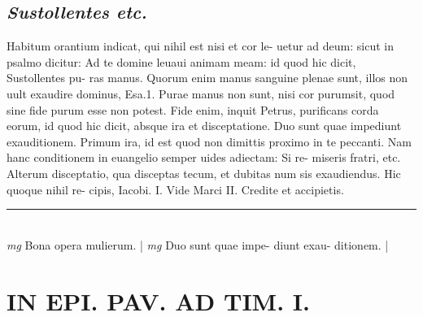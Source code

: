 \documentclass{article}
\begin{document}
\begin{pages}
\subsection*{\textit{Sustollentes etc. }}\pstart Habitum orantium indicat, qui nihil est nisi et cor le- uetur ad deum: sicut in psalmo dicitur: Ad te domine leuaui animam meam: id quod hic dicit, Sustollentes pu- ras manus. Quorum enim manus sanguine plenae sunt, illos non uult exaudire dominus, Esa.1. Purae manus non sunt, nisi cor purumsit, quod sine fide purum esse non potest. Fide enim, inquit Petrus, purificans corda eorum, id quod hic dicit, absque  ira et disceptatione. Duo sunt quae impediunt exauditionem. Primum ira, id est quod non dimittis proximo in te peccanti. Nam hanc conditionem in euangelio semper uides adiectam: Si re- miseris fratri, etc. Alterum disceptatio, qua disceptas tecum, et dubitas num sis exaudiendus. Hic quoque  nihil re- cipis, Iacobi. I. Vide Marci II. Credite et accipietis.  \pend
\vspace{0.5cm}\noindent
\vspace{0.2cm}\rule{1cm}{0.2pt}\\ 
\hspace{0.2cm}\textit{mg}
\footnotesize Bona opera mulierum. 
\normalsize| 
\hspace{0.2cm}\textit{mg}
\footnotesize Duo sunt quae impe- diunt exau- ditionem. 
\normalsize| 
\section*{IN EPI. PAV. AD TIM. I. }
\marginpar{[ p.86 ]}
{}

\end{pages}
\end{document}
